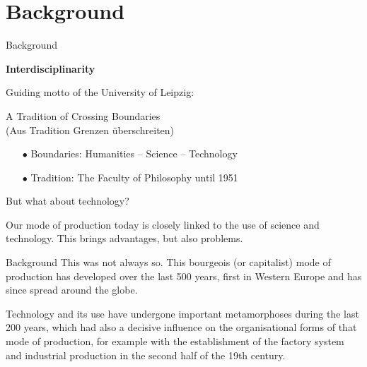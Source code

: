 \documentclass{beamer}
\title{Modelling Sustainable Systems\\ and Semantic Web\\[6pt] Introduction
  \vskip1em}
\subtitle{Lecture in the Module 10-202-2309\\ for Master Computer Science}
\author{Prof. Dr. Hans-Gert Gräbe\\
\url{http://www.informatik.uni-leipzig.de/~graebe}}
\date{October 2021}
\newcommand{\ueberschrift}[1]{\begin{center}\bf #1\end{center}}
\begin{document}
{
\begin{frame}
  \titlepage
\end{frame}}

\section{Background}
\begin{frame}{Background}

\ueberschrift{Interdisciplinarity}

Guiding motto of the University of Leipzig:
\begin{center}
  A Tradition of Crossing Boundaries\\ (Aus Tradition Grenzen überschreiten) 
\end{center}

\begin{itemize}
\item[$\bullet$]  Boundaries: Humanities -- Science -- Technology
\item[$\bullet$]  Tradition: The Faculty of Philosophy until 1951
\end{itemize}

But what about technology?

Our mode of production today is closely linked to the use of science and
technology. This brings advantages, but also problems.
\end{frame}

\begin{frame}{Background}
This was not always so. This bourgeois (or capitalist) mode of production has
developed over the last 500 years, first in Western Europe and has since
spread around the globe.

Technology and its use have undergone important metamorphoses during the last
200 years, which had also a decisive influence on the organisational forms of
that mode of production, for example with the establishment of the factory
system and industrial production in the second half of the 19th century.
\end{frame}
\end{document}
